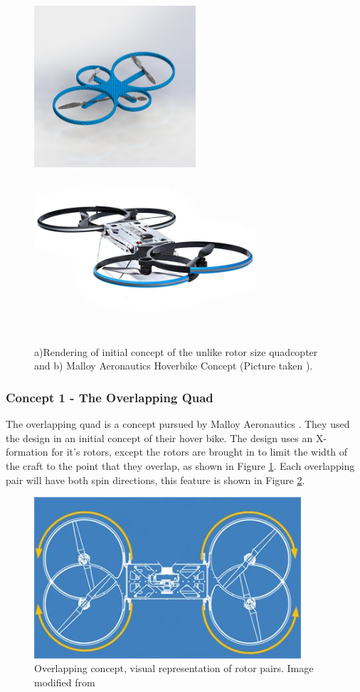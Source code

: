 \begin{figure}[H]
\centering
\includegraphics[height = 6cm]{Images/Design/UnlikeSizes}
\includegraphics[height = 6cm]{Images/Design/Overlapping}
\caption{a)Rendering of initial concept of the unlike rotor size quadcopter and b) Malloy Aeronautics Hoverbike Concept (Picture taken \cite{MAHover}).}
\label{IM_UnlikeSizes}
\end{figure}


\subsubsection{Concept 1 - The Overlapping Quad}
The overlapping quad is a concept pursued by Malloy Aeronautics \cite{MAHover}. They used the design in an initial concept of their hover bike. The design uses an X-formation for it's rotors, except the rotors are brought in to limit the width of the craft to the point that they overlap, as shown in Figure \ref{IM_UnlikeSizes}. Each overlapping pair will have both spin directions, this feature is shown in Figure \ref{IM_OverlappingPair}.

\begin{figure}[H]
\centering
\includegraphics[height = 6cm]{Images/Design/OverlappingVD}
\caption{Overlapping concept, visual representation of rotor pairs. Image modified from \cite{MAHover}}
\label{IM_OverlappingPair}
\end{figure}

